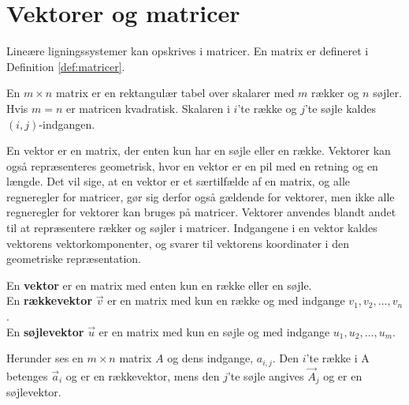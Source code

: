 \section{Vektorer og matricer}

Lineære ligningssystemer kan opskrives i matricer. 
En matrix er defineret i Definition \ref{def:matricer}.

\begin{defn}[Matrix]
En $m \times n$ matrix er en rektangulær tabel over skalarer med $m$ rækker og $n$ søjler. 
Hvis $m=n$ er matricen kvadratisk. 
Skalaren i $i$'te række og $j$'te søjle kaldes $(i,j)$-indgangen.
\label{def:matricer}
\end{defn}

En vektor er en matrix, der enten kun har en søjle eller en række. 
Vektorer kan også repræsenteres geometrisk, hvor en vektor er en pil med en retning og en længde.
Det vil sige, at en vektor er et særtilfælde af en matrix, og alle regneregler for matricer, gør sig derfor også gældende for vektorer, men ikke alle regneregler for vektorer kan bruges på matricer.
Vektorer anvendes blandt andet til at repræsentere rækker og søjler i matricer. 
Indgangene i en vektor kaldes vektorens vektorkomponenter, og svarer til vektorens koordinater i den geometriske repræsentation.

\begin{defn}[Vektor]
En \textbf{vektor} er en matrix med enten kun en række eller en søjle. \\
En \textbf{rækkevektor} $\vec{v}$ er en matrix med kun en række og med indgange $v_1,v_2,...,v_n$.\\
En \textbf{søjlevektor} $\vec{u}$ er en matrix med kun en søjle og med indgange $u_1,u_2,...,u_m$.\\
\end{defn}

Herunder ses en $m \times n$ matrix $A$ og dens indgange, $a_{i,j}$. Den $i$'te række i A betenges $\vec{a}_i$ og er en rækkevektor, mens den $j$'te søjle angives $\vec{A}_j$ og er en søjlevektor.


